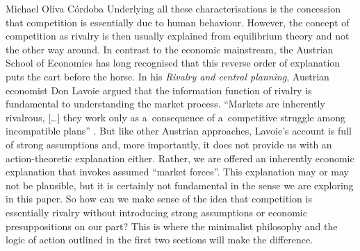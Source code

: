 \begin{artengenv}{Michael Oliva Córdoba}
Underlying all these characterisations is the concession that competition is essentially due to human behaviour. However, the concept of competition as rivalry is then usually explained from equilibrium theory and not the other way around. In contrast to the economic mainstream, the Austrian School of Economics has long recognised that this reverse order of explanation puts the cart before the horse. In his \textit{Rivalry and central planning}, Austrian economist {Don Lavoie} argued that the information function of rivalry is fundamental to understanding the market process. ``Markets are inherently rivalrous, […] they work only as a~consequence of a~competitive struggle among incompatible plans'' 
\parencite[][p.~180\ \mbox{[orig.~1985]}]{lavoie_rivalry_2015}. %
 But like other Austrian approaches, Lavoie's account is full of strong assumptions and, more importantly, it does not provide us with an action-theoretic explanation either. Rather, we are offered an inherently economic explanation that invokes assumed ``market forces''. This explanation may or may not be plausible, but it is certainly not fundamental in the sense we are exploring in this paper. So how can we make sense of the idea that competition is essentially rivalry without introducing strong assumptions or economic presuppositions on our part? This is where the minimalist philosophy and the logic of action outlined in the first two sections will make the difference.




\end{artengenv}
